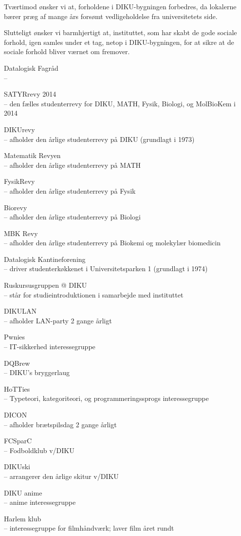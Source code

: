 \documentclass[a4paper]{article}
\begin{document}
Tværtimod ønsker vi at, forholdene i DIKU-bygningen forbedres, da
lokalerne bærer præg af mange års forsømt vedligeholdelse fra
universitetets side.

Slutteligt ønsker vi barmhjertigt at, instituttet, som har skabt de gode
sociale forhold, igen samles under et tag, netop i DIKU-bygningen, for at sikre
at de sociale forhold bliver værnet om fremover.

\begin{flushright}

\footnotesize\sffamily\itshape

Datalogisk Fagråd \\
--

SATYRrevy 2014 \\
-- den fælles studenterrevy for DIKU, MATH, Fysik, Biologi, og MolBioKem i 2014

DIKUrevy \\
-- afholder den årlige studenterrevy på DIKU (grundlagt i 1973)

Matematik Revyen \\
-- afholder den årlige studenterrevy på MATH

FysikRevy \\
-- afholder den årlige studenterrevy på Fysik

Biorevy \\
-- afholder den årlige studenterrevy på Biologi

MBK Revy \\
-- afholder den årlige studenterrevy på Biokemi og molekylær biomedicin

Datalogisk Kantineforening \\
-- driver studenterkøkkenet i Universitetsparken 1 (grundlagt i 1974)

Ruskursusgruppen @ DIKU \\
-- står for studieintroduktionen i samarbejde med instituttet

DIKULAN \\
-- afholder LAN-party 2 gange årligt

Pwnies \\
-- IT-sikkerhed interessegruppe

DQBrew \\
-- DIKU's bryggerlaug

HoTTies \\
-- Typeteori, kategoriteori, og programmeringssprogs interessegruppe

DICON \\
-- afholder brætspilsdag 2 gange årligt

FCSparC \\
-- Fodboldklub v/DIKU

DIKUski \\
-- arrangerer den årlige skitur v/DIKU

DIKU anime \\
-- anime interessegruppe

Harlem klub \\
-- interessegruppe for filmhåndværk;  laver film året rundt

\end{flushright}
\end{document}
